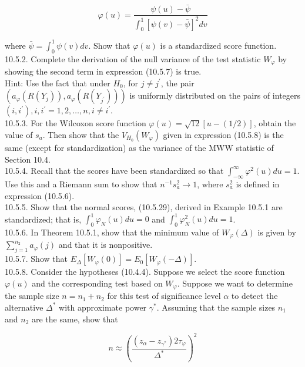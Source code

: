 $$
\varphi(u)=\frac{\psi(u)-\bar{\psi}}{\int_{0}^{1}[\psi(v)-\bar{\psi}]^{2} d v}
$$

where $\bar{\psi}=\int_{0}^{1} \psi(v) d v$. Show that $\varphi(u)$ is a standardized score function.\\
10.5.2. Complete the derivation of the null variance of the test statistic $W_{\varphi}$ by showing the second term in expression (10.5.7) is true.\\
Hint: Use the fact that under $H_{0}$, for $j \neq j^{\prime}$, the pair $\left(a_{\varphi}\left(R\left(Y_{j}\right)\right), a_{\varphi}\left(R\left(Y_{j^{\prime}}\right)\right)\right)$ is uniformly distributed on the pairs of integers $\left(i, i^{\prime}\right), i, i^{\prime}=1,2, \ldots, n, i \neq i^{\prime}$.\\
10.5.3. For the Wilcoxon score function $\varphi(u)=\sqrt{12}[u-(1 / 2)]$, obtain the value of $s_{a}$. Then show that the $V_{H_{0}}\left(W_{\varphi}\right)$ given in expression (10.5.8) is the same (except for standardization) as the variance of the MWW statistic of Section 10.4.\\
10.5.4. Recall that the scores have been standardized so that $\int_{-\infty}^{\infty} \varphi^{2}(u) d u=1$. Use this and a Riemann sum to show that $n^{-1} s_{a}^{2} \rightarrow 1$, where $s_{a}^{2}$ is defined in expression (10.5.6).\\
10.5.5. Show that the normal scores, (10.5.29), derived in Example 10.5.1 are standardized; that is, $\int_{0}^{1} \varphi_{N}(u) d u=0$ and $\int_{0}^{1} \varphi_{N}^{2}(u) d u=1$.\\
10.5.6. In Theorem 10.5.1, show that the minimum value of $W_{\varphi}(\Delta)$ is given by $\sum_{j=1}^{n_{2}} a_{\varphi}(j)$ and that it is nonpositive.\\
10.5.7. Show that $E_{\Delta}\left[W_{\varphi}(0)\right]=E_{0}\left[W_{\varphi}(-\Delta)\right]$.\\
10.5.8. Consider the hypotheses (10.4.4). Suppose we select the score function $\varphi(u)$ and the corresponding test based on $W_{\varphi}$. Suppose we want to determine the sample size $n=n_{1}+n_{2}$ for this test of significance level $\alpha$ to detect the alternative $\Delta^{*}$ with approximate power $\gamma^{*}$. Assuming that the sample sizes $n_{1}$ and $n_{2}$ are the same, show that


\begin{equation*}
n \approx\left(\frac{\left(z_{\alpha}-z_{\gamma^{*}}\right) 2 \tau_{\varphi}}{\Delta^{*}}\right)^{2} \tag{10.5.38}
\end{equation*}


